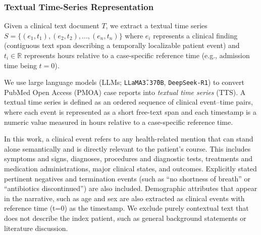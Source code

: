 
\subsubsection{Textual Time-Series Representation}\label{ch05:sec:textual-time-series}

{\raggedright
Given a clinical text document $T$, we extract a textual time series $S = \{(e_1,t_1), (e_2,t_2),...,(e_n,t_n)\}$ where $e_i$ represents a clinical finding (contiguous text span describing a temporally localizable patient event) and $t_i \in \mathbb{R}$ represents hours relative to a case-specific reference time (e.g., admission time being $t=0$).\par}

We use large language models (LLMs; \texttt{LLaMA\~3.3\~70B}, \texttt{DeepSeek-R1}) to convert PubMed Open Access (PMOA) case reports into \emph{textual time series} (TTS).
A textual time series is defined as an ordered sequence of clinical event–time pairs, where each event is represented as a short free-text span and each timestamp is a numeric value measured in hours relative to a case-specific reference time.

In this work, a clinical event refers to any health-related mention that can stand alone semantically and is directly relevant to the patient’s course.
This includes symptoms and signs, diagnoses, procedures and diagnostic tests, treatments and medication administrations, major clinical states, and outcomes.
Explicitly stated pertinent negatives and termination events (such as “no shortness of breath” or “antibiotics discontinued”) are also included. 
Demographic attributes that appear in the narrative, such as age and sex are also extracted as clinical events with reference time (t=0) as the timestamp.
We exclude purely contextual text that does not describe the index patient, such as general background statements or literature discussion.


